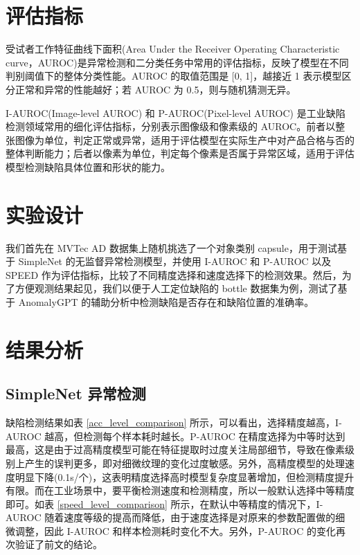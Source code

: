 \documentclass[
  ]{njuthesis}
\begin{document}
\section{评估指标}

受试者工作特征曲线下面积(Area Under the Receiver Operating Characteristic curve，AUROC)是异常检测和二分类任务中常用的评估指标，反映了模型在不同判别阈值下的整体分类性能。AUROC 的取值范围是 [0, 1]，越接近 1 表示模型区分正常和异常的性能越好；若 AUROC 为 0.5，则与随机猜测无异。

I-AUROC(Image-level AUROC) 和 P-AUROC(Pixel-level AUROC) 是工业缺陷检测领域常用的细化评估指标，分别表示图像级和像素级的 AUROC。前者以整张图像为单位，判定正常或异常，适用于评估模型在实际生产中对产品合格与否的整体判断能力；后者以像素为单位，判定每个像素是否属于异常区域，适用于评估模型检测缺陷具体位置和形状的能力。

\section{实验设计}

我们首先在 MVTec AD 数据集上随机挑选了一个对象类别 capsule，用于测试基于 SimpleNet 的无监督异常检测模型，并使用 I-AUROC 和 P-AUROC 以及 SPEED 作为评估指标，比较了不同精度选择和速度选择下的检测效果。然后，为了方便观测结果起见，我们以便于人工定位缺陷的 bottle 数据集为例，测试了基于 AnomalyGPT 的辅助分析中检测缺陷是否存在和缺陷位置的准确率。

\section{结果分析}

\subsection{SimpleNet 异常检测}

缺陷检测结果如表 \ref{acc_level_comparison} 所示，可以看出，选择精度越高，I-AUROC 越高，但检测每个样本耗时越长。P-AUROC 在精度选择为中等时达到最高，这是由于过高精度模型可能在特征提取时过度关注局部细节，导致在像素级别上产生的误判更多，即对细微纹理的变化过度敏感。另外，高精度模型的处理速度明显下降(0.1s/个)，这表明精度选择高时模型复杂度显著增加，但检测精度提升有限。而在工业场景中，要平衡检测速度和检测精度，所以一般默认选择中等精度即可。如表 \ref{speed_level_comparison} 所示，在默认中等精度的情况下，I-AUROC 随着速度等级的提高而降低，由于速度选择是对原来的参数配置做的细微调整，因此 I-AUROC 和样本检测耗时变化不大。另外，P-AUROC 的变化再次验证了前文的结论。
\end{document}
